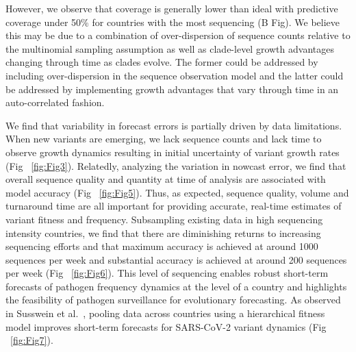 \documentclass[10pt,letterpaper]{article}
\begin{document}
However, we observe that coverage is generally lower than ideal with predictive coverage under 50\% for countries with the most sequencing (B Fig).
We believe this may be due to a combination of over-dispersion of sequence counts relative to the multinomial sampling assumption as well as clade-level growth advantages changing through time as clades evolve.
The former could be addressed by including over-dispersion in the sequence observation model and the latter could be addressed by implementing growth advantages that vary through time in an auto-correlated fashion.


We find that variability in forecast errors is partially driven by data limitations.
When new variants are emerging, we lack sequence counts and lack time to observe growth dynamics resulting in initial uncertainty of variant growth rates (Fig ~\ref{fig:Fig3}).
Relatedly, analyzing the variation in nowcast error, we find that overall sequence quality and quantity at time of analysis are associated with model accuracy (Fig ~\ref{fig:Fig5}).
Thus, as expected, sequence quality, volume and turnaround time are all important for providing accurate, real-time estimates of variant fitness and frequency.
Subsampling existing data in high sequencing intensity countries, we find that there are diminishing returns to increasing sequencing efforts and that maximum accuracy is achieved at around 1000 sequences per week and substantial accuracy is achieved at around 200 sequences per week (Fig ~\ref{fig:Fig6}).
This level of sequencing enables robust short-term forecasts of pathogen frequency dynamics at the level of a country and highlights the feasibility of pathogen surveillance for evolutionary forecasting.
As observed in Susswein et al.\ \cite{susswein2023leveraging}, pooling data across countries using a hierarchical fitness model improves short-term forecasts for SARS-CoV-2 variant dynamics (Fig ~\ref{fig:Fig7}).
\end{document}

